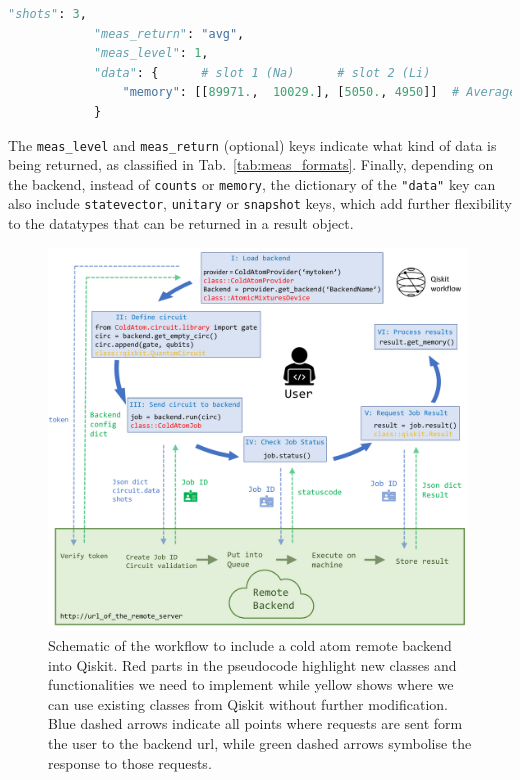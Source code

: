 \documentclass[a4paper, 10pt]{article}
\newcommand{\co}[1]{\texttt{#1}}
\begin{document}
\begin{minipage}{\linewidth}
\begin{lstlisting}[language=Python, caption = Part of the data in Lst.~\ref{lst:minimal_res_example} modified to the case where average results are returned to the user., label = {lst:minimal_res_example_avg}]
            "shots": 3,
            "meas_return": "avg",
            "meas_level": 1,
            "data": {      # slot 1 (Na)      # slot 2 (Li)
                "memory": [[89971.,  10029.], [5050., 4950]]  # Average of three shots
            }
\end{lstlisting}
\end{minipage}

The \co{meas\_level} and \co{meas\_return} (optional) keys indicate what kind of data is being returned, as classified in Tab.~\ref{tab:meas_formats}. Finally, depending on the backend, instead of \co{counts} or \co{memory}, the dictionary of the \co{"data"} key can also include \co{statevector}, \co{unitary} or \co{snapshot} keys, which add further flexibility to the datatypes that can be returned in a result object.

\begin{figure}
    \centering
    \includegraphics[width=0.99\textwidth]{figs/workflow_diagram.pdf}
    \caption{Schematic of the workflow to include a cold atom remote backend into Qiskit.
    Red parts in the pseudocode highlight new classes and functionalities we need to implement while yellow shows where we can use existing classes from Qiskit without further modification.
    Blue dashed arrows indicate all points where requests are sent form the user to the backend url, while green dashed arrows symbolise the response to those requests. }
    \label{fig:workflow_diagram}
\end{figure}
\end{document}
